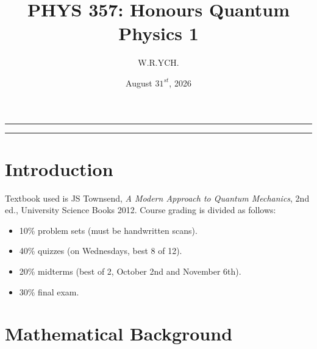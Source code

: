 \documentclass{article}
\begin{document}
\title{PHYS 357: Honours Quantum Physics 1}
\author{W.R.YCH.}
\date{August \(31^{st}\), 2026}
\setcounter{Maxaffil}{0}
\renewcommand\Affilfont{\itshape\small}
\maketitle
\noindent\rule{\textwidth}{0.4pt}
\thispagestyle{empty}
\begin{abstract}
\end{abstract}
\noindent\rule{\textwidth}{0.4pt}
\clearpage
\pagestyle{empty}
{
  \hypersetup{linkcolor=black}
  \tableofcontents
}
\clearpage
\pagestyle{plain}
\setcounter{page}{1}


\section{Introduction}
Textbook used is JS Townsend, \emph{A Modern Approach to Quantum Mechanics}, 2nd ed., University Science Books 2012. Course grading is divided as follows:
\begin{itemize}
    \item 10\% problem sets (must be handwritten scans).
    \item 40\% quizzes (on Wednesdays, best 8 of 12).
    \item 20\% midterms (best of 2, October 2nd and November 6th).
    \item 30\% final exam.
\end{itemize}


\section{Mathematical Background}
\end{document}
